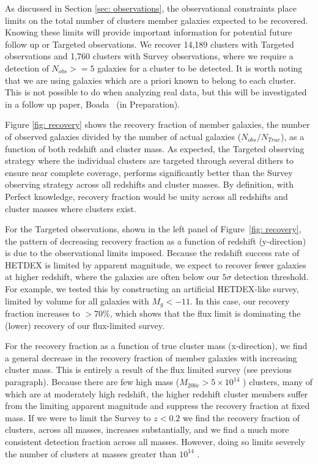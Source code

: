 \documentclass[fleqn,usenatbib]{mnras}
\begin{document}
As discussed in Section \ref{sec: observations}, the observational constraints place limits on the total number of clusters member galaxies expected to be recovered. Knowing these limits will provide important information for potential future follow up or Targeted observations. We recover 14,189 clusters with Targeted observations and 1,760 clusters with Survey observations, where we require a detection of $N_{obs} >=5$ galaxies for a cluster to be detected. It is worth noting that we are using galaxies which are a priori known to belong to each cluster. This is not possible to do when analyzing real data, but this will be investigated in a follow up paper, Boada \etal\ (in Preparation).

Figure \ref{fig: recovery} shows the recovery fraction of member galaxies, the number of observed galaxies divided by the number of actual galaxies ($N_{obs}/N_{True}$), as a function of both redshift and cluster mass. As expected, the Targeted observing strategy where the individual clusters are targeted through several dithers to ensure near complete coverage, performs significantly better than the Survey observing strategy across all redshifts and cluster masses. By definition, with Perfect knowledge, recovery fraction would be unity across all redshifts and cluster masses where clusters exist.

For the Targeted observations, shown in the left panel of Figure~\ref{fig: recovery}, the pattern of decreasing recovery fraction as a function of redshift (y-direction) is due to the observational limits imposed. Because the redshift success rate of HETDEX is limited by apparent magnitude, we expect to recover fewer galaxies at higher redshift, where the galaxies are often below our $5\sigma$ detection threshold. For example, we tested this by constructing an artificial HETDEX-like survey, limited by volume for all galaxies with $M_g < -11$. In this case, our recovery fraction increases to $>70$\%, which shows that the flux limit is dominating the (lower) recovery of our flux-limited survey.

For the recovery fraction as a function of true cluster mass (x-direction), we find a general decrease in the recovery fraction of member galaxies with increasing cluster mass. This  is entirely a result of the flux limited survey (see previous paragraph). Because there are few high mass ($M_{200c}>5\times10^{14}$ \Msol) clusters, many of which are at moderately high redshift, the higher redshift cluster members suffer from the limiting apparent magnitude and suppress the recovery fraction at fixed mass. If we were to limit the Survey to $z<0.2$ we find the recovery fraction of clusters, across all masses, increases substantially, and we find a much more consistent detection fraction across all masses. However, doing so limits severely the number of clusters at masses greater than $10^{14}$ \Msol. 
\end{document}
